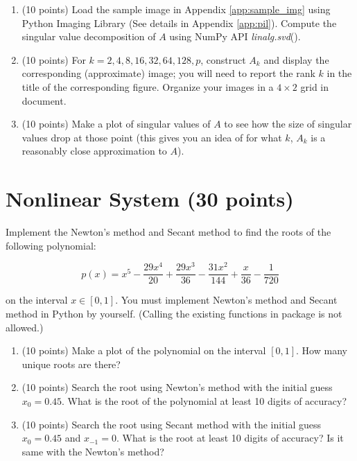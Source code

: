 \documentclass[10pt]{article}
\begin{document}
\begin{enumerate}[label=3.\arabic*]
    \item (10 points) 
    Load the sample image in Appendix \ref{app:sample_img} using Python Imaging Library (See details in Appendix \ref{app:pil}). Compute the singular value decomposition of $A$ using NumPy API \textit{linalg.svd}().
    \item (10 points)
    For $k=2,4,8,16,32,64,128,p$, construct $A_k$ and display the corresponding (approximate) image; you will need to report the rank $k$ in the title of the corresponding figure. Organize your images in a $4\times2$ grid in document.
    \item (10 points)
    Make a plot of singular values of $A$ to see how the size of singular values drop at those point (this gives you an idea of for what $k$, $A_k$ is a reasonably close approximation to $A$).
\end{enumerate}

\section{Nonlinear System (30 points)}
Implement the Newton's method and Secant method to find the roots of the following polynomial:

$$
p(x)=x^{5}-\frac{29 x^{4}}{20}+\frac{29 x^{3}}{36}-\frac{31 x^{2}}{144}+\frac{x}{36}-\frac{1}{720}
$$

on the interval $x \in[0,1]$. 
You must implement Newton's method and Secant method in Python by yourself. 
(Calling the existing functions in package is not allowed.)

\begin{enumerate}[label=4.\arabic*]
    \item (10 points)
    Make a plot of the polynomial on the interval $[0,1]$. How many unique roots are there? 
    \item (10 points)
    Search the root using Newton's method with the initial guess $x_0=0.45$. What is the root of the polynomial at least 10 digits of accuracy?
    \item (10 points)
    Search the root using Secant method with the initial guess $x_0=0.45$ and $x_{-1}=0$. What is the root at least 10 digits of accuracy? Is it same with the Newton's method?
\end{enumerate}

% 
% 
\end{document}
